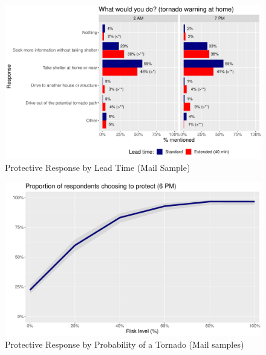 \documentclass{ametsocV6.1}
\begin{document}
\newpage
\appendix[B] 

\begin{figure}[!htbp]
\centering
\includegraphics[scale=0.55]{../Graphs/comp_responses_w.pdf} 
\caption{Protective Response by Lead Time (Mail Sample)}\label{comp_responses}
\end{figure}

\begin{figure}[!htbp]
\includegraphics[scale=0.55]{../Graphs/threat_resp_mail_w.pdf} 
\caption{Protective Response by Probability of a Tornado (Mail samples)}\label{threat_resp_mail}
\end{figure}

\newpage


\end{document}
